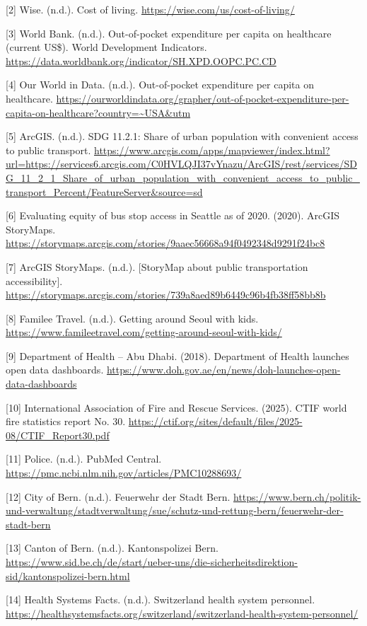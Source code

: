 \documentclass[11pt,letterpaper]{article}
\begin{document}
[2] Wise. (n.d.). Cost of living. \url{https://wise.com/us/cost-of-living/}


[3] World Bank. (n.d.). Out-of-pocket expenditure per capita on healthcare (current US\$). World 
Development Indicators. \url{https://data.worldbank.org/indicator/SH.XPD.OOPC.PC.CD}


[4] Our World in Data. (n.d.). Out-of-pocket expenditure per capita on healthcare. \url{https://ourworldindata.org/grapher/out-of-pocket-expenditure-per-capita-on-healthcare?country=~USA&utm}


[5] ArcGIS. (n.d.). SDG 11.2.1: Share of urban population with convenient access to public 
transport. \url{https://www.arcgis.com/apps/mapviewer/index.html?url=https://services6.arcgis.com/C0HVLQJI37vYnazu/ArcGIS/rest/services/SDG_11_2_1_Share_of_urban_population_with_convenient_access_to_public_transport_Percent/FeatureServer&source=sd}


[6] Evaluating equity of bus stop access in Seattle as of 2020. (2020). ArcGIS StoryMaps. 
\url{https://storymaps.arcgis.com/stories/9aaec56668a94f0492348d9291f24bc8}


[7] ArcGIS StoryMaps. (n.d.). [StoryMap about public transportation accessibility]. \url{https://storymaps.arcgis.com/stories/739a8aed89b6449c96b4fb38ff58bb8b}


[8] Familee Travel. (n.d.). Getting around Seoul with kids. \url{https://www.famileetravel.com/getting-around-seoul-with-kids/}


[9] Department of Health -- Abu Dhabi. (2018). Department of Health launches open data 
dashboards. \url{https://www.doh.gov.ae/en/news/doh-launches-open-data-dashboards}


[10] International Association of Fire and Rescue Services. (2025). CTIF world fire statistics 
report No. 30. \url{https://ctif.org/sites/default/files/2025-08/CTIF_Report30.pdf}


[11] Police. (n.d.). PubMed Central. \url{https://pmc.ncbi.nlm.nih.gov/articles/PMC10288693/}


[12] City of Bern. (n.d.). Feuerwehr der Stadt Bern. \url{https://www.bern.ch/politik-und-verwaltung/stadtverwaltung/sue/schutz-und-rettung-bern/feuerwehr-der-stadt-bern}


[13] Canton of Bern. (n.d.). Kantonspolizei Bern. \url{https://www.sid.be.ch/de/start/ueber-uns/die-sicherheitsdirektion-sid/kantonspolizei-bern.html}


[14] Health Systems Facts. (n.d.). Switzerland health system personnel. \url{https://healthsystemsfacts.org/switzerland/switzerland-health-system-personnel/}
\end{document}
